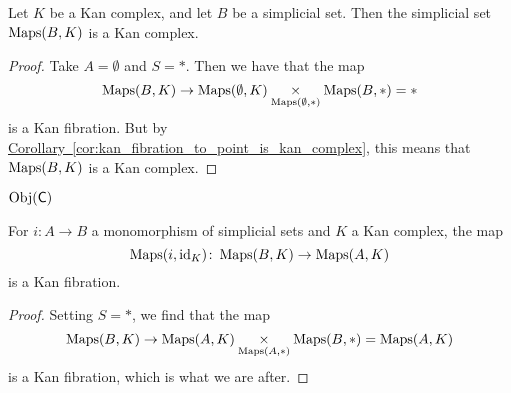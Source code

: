 \documentclass[main.tex]{subfiles}
\begin{document}
\begin{corollary}
  Let $K$ be a Kan complex, and let $B$ be a simplicial set. Then the simplicial set $\operatorname{Maps}(B, K)$ is a Kan complex.
\end{corollary}
\begin{proof}
  Take $A = \emptyset$ and $S = *$. Then we have that the map
  \begin{equation*}
    \operatorname{Maps}(B, K) \to \operatorname{Maps}(\emptyset, K) \underset{\operatorname{Maps}(\emptyset,*)}{\times} \operatorname{Maps}(B, *) = *
  \end{equation*}
  is a Kan fibration. But by \hyperref[cor:kan_fibration_to_point_is_kan_complex]{Corollary~\ref*{cor:kan_fibration_to_point_is_kan_complex}}, this means that $\operatorname{Maps}(B, K)$ is a Kan complex.
\end{proof}

$\operatorname{Obj}(\mathsf{C})$

\begin{corollary}
  \label{cor:maps_functor_preserves_kan_fibrations_in_first_slot}
  For $i\colon A \to B$ a monomorphism of simplicial sets and $K$ a Kan complex, the map
  \begin{equation*}
    \operatorname{Maps}(i, \mathrm{id}_{K})\colon \operatorname{Maps}(B, K) \to \operatorname{Maps}(A, K)
  \end{equation*}
  is a Kan fibration.
\end{corollary}
\begin{proof}
  Setting $S = *$, we find that the map
  \begin{equation*}
    \operatorname{Maps}(B, K) \to \operatorname{Maps}(A, K) \underset{\operatorname{Maps}(A, *)} \times \operatorname{Maps}(B, *) = \operatorname{Maps}(A, K)
  \end{equation*}
  is a Kan fibration, which is what we are after.
\end{proof}
\end{document}
